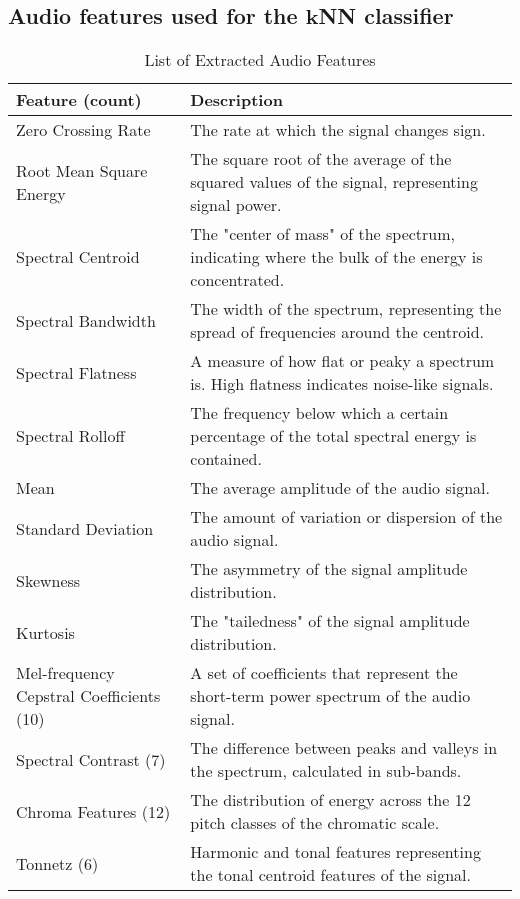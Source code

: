 \subsection{Audio features used for the $\mathbf{k}$NN classifier}
\label{sec:Appendix4}
\begin{table}[h]
    \centering
    \small
    \caption{List of Extracted Audio Features}
    \label{tab:features}
    \begin{tabular}{>{\raggedright\arraybackslash}p{} >{\raggedright\arraybackslash}p{}}
        \toprule
        \textbf{Feature} (count) & \textbf{Description} \\
        \midrule
        Zero Crossing Rate & The rate at which the signal changes sign. \\
        Root Mean Square Energy & The square root of the average of the squared values of the signal, representing signal power. \\
        Spectral Centroid & The "center of mass" of the spectrum, indicating where the bulk of the energy is concentrated. \\
        Spectral Bandwidth & The width of the spectrum, representing the spread of frequencies around the centroid. \\
        Spectral Flatness & A measure of how flat or peaky a spectrum is. High flatness indicates noise-like signals. \\
        Spectral Rolloff  & The frequency below which a certain percentage of the total spectral energy is contained. \\
        \midrule
        Mean & The average amplitude of the audio signal. \\
        Standard Deviation & The amount of variation or dispersion of the audio signal. \\
        Skewness & The asymmetry of the signal amplitude distribution. \\
        Kurtosis & The "tailedness" of the signal amplitude distribution. \\
        \midrule
        Mel-frequency Cepstral Coefficients (10) & A set of coefficients that represent the short-term power spectrum of the audio signal. \\
        Spectral Contrast (7) & The difference between peaks and valleys in the spectrum, calculated in sub-bands. \\
        Chroma Features (12) & The distribution of energy across the 12 pitch classes of the chromatic scale. \\
        Tonnetz (6) & Harmonic and tonal features representing the tonal centroid features of the signal. \\
        \bottomrule
    \end{tabular}
\end{table}
